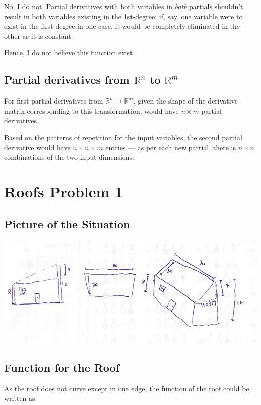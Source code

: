 \documentclass[letterpaper]{article}
\begin{document}
No, I do not. Partial derivatives with both variables in \emph{both} partials shouldn't result in both variables existing in the 1st-degree: if, say, one variable were to exist in the first degree in one case, it would be completely eliminated in the other as it is constant. 

Hence, I do not believe this function exist.

\subsection{Partial derivatives from \(\mathbb{R}^n\) to \(\mathbb{R}^m\)}
\label{sec:org984614d}
For first partial derivatives from \(\mathbb{R}^n \to \mathbb{R}^m\), given the shape of the derivative matrix corresponding to this transformation, would have \(n\times m\) partial derivatives.

Based on the patterns of repetition for the input variables, the second partial derivative would have \(n \times n \times m\) entries --- as per each new partial, there is \(n \times n\) combinations of the two input dimensions. 

\section{Roofs Problem 1}
\label{sec:org25d1bcb}
\subsection{Picture of the Situation}
\label{sec:orgba6d205}

\begin{center}
\includegraphics[width=.9\linewidth]{2021-10-29_20-16-14_screenshot.png}
\end{center}


\subsection{Function for the Roof}
\label{sec:org02c90f6}
As the roof does not curve except in one edge, the function of the roof could be written as:
\end{document}
